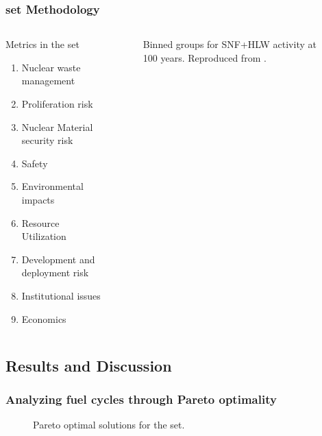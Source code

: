 \begin{frame}
    \frametitle{\gls{set} Methodology}
    \begin{columns}
        \column[t]{3.5cm}
        \begin{block}{Metrics in the \gls{set}}
            \begin{enumerate}
                \item Nuclear waste management
                \item Proliferation risk
                \item Nuclear Material security risk
                \item Safety
                \item Environmental impacts
                \item Resource Utilization
                \item Development and deployment risk
                \item Institutional issues
                \item Economics
            \end{enumerate}        
        \end{block}
        \column[t]{6.5cm}
          \begin{figure}[htbp!]
            \begin{center}
            \resizebox{\columnwidth}{!}{}
            \end{center}
                \caption{Binned groups for SNF+HLW activity at 100 years.
                Reproduced from \cite{wigeland_nuclear_2014}.}
            \label{fig:set_activity_bin}
        \end{figure}
    \end{columns}
\end{frame}

\subsection{Results and Discussion}
\begin{frame}
    \frametitle{Analyzing fuel cycles through Pareto optimality}
        
  \begin{figure}[htbp!]
    \begin{center}
      \resizebox{0.9\columnwidth}{!}{}
    \end{center}
          \caption{Pareto optimal solutions for the \gls{set}.}
    \label{fig:full-set-pcp}
  \end{figure}
\end{frame}


